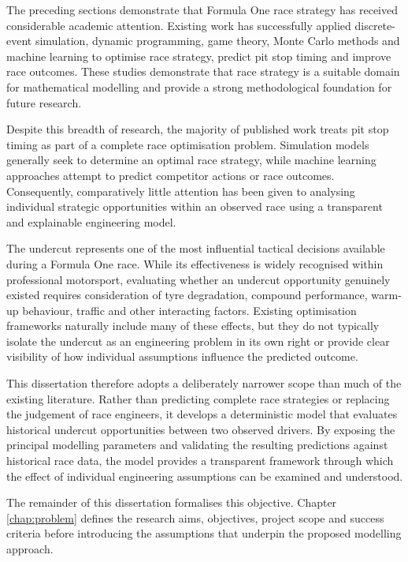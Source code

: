 The preceding sections demonstrate that Formula One race strategy has received considerable academic attention. Existing work has successfully applied discrete-event simulation, dynamic programming, game theory, Monte Carlo methods and machine learning to optimise race strategy, predict pit stop timing and improve race outcomes. These studies demonstrate that race strategy is a suitable domain for mathematical modelling and provide a strong methodological foundation for future research.

Despite this breadth of research, the majority of published work treats pit stop timing as part of a complete race optimisation problem. Simulation models generally seek to determine an optimal race strategy, while machine learning approaches attempt to predict competitor actions or race outcomes. Consequently, comparatively little attention has been given to analysing individual strategic opportunities within an observed race using a transparent and explainable engineering model.

The undercut represents one of the most influential tactical decisions available during a Formula One race. While its effectiveness is widely recognised within professional motorsport, evaluating whether an undercut opportunity genuinely existed requires consideration of tyre degradation, compound performance, warm-up behaviour, traffic and other interacting factors. Existing optimisation frameworks naturally include many of these effects, but they do not typically isolate the undercut as an engineering problem in its own right or provide clear visibility of how individual assumptions influence the predicted outcome.

This dissertation therefore adopts a deliberately narrower scope than much of the existing literature. Rather than predicting complete race strategies or replacing the judgement of race engineers, it develops a deterministic model that evaluates historical undercut opportunities between two observed drivers. By exposing the principal modelling parameters and validating the resulting predictions against historical race data, the model provides a transparent framework through which the effect of individual engineering  assumptions can be examined and understood.

The remainder of this dissertation formalises this objective. Chapter \ref{chap:problem} defines the research aims, objectives, project scope and success criteria before introducing the assumptions that underpin the proposed modelling approach.